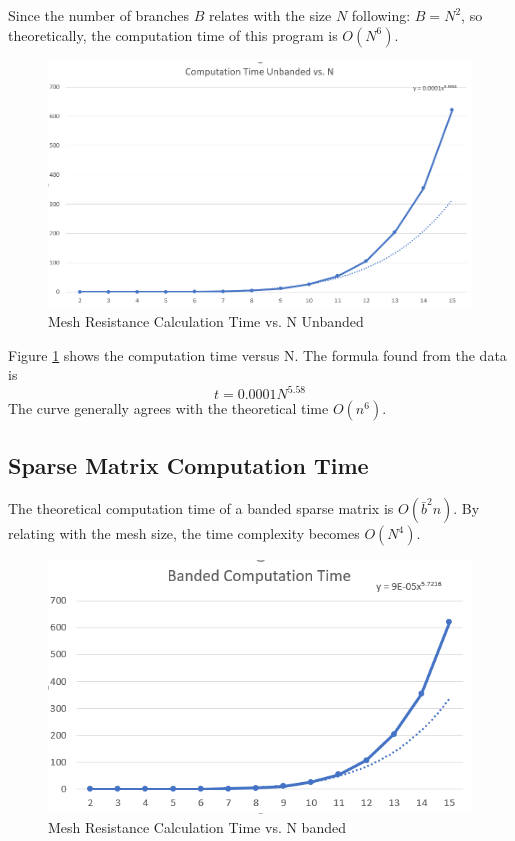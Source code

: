 \documentclass[a4paper,titlepage]{article}
\begin{document}
			Since the number of branches $B$ relates with the size $N$ following: $B = N^2$, so theoretically, the computation time of this program is $O(N^6)$. 			
			\begin{figure}[!h]
				\centering
				\includegraphics[width=\linewidth]{comp_time_unbanded}
				\caption{Mesh Resistance Calculation Time vs. N Unbanded}
				\label{comp_unbanded}
			\end{figure}
		
			Figure \ref{comp_unbanded} shows the computation time versus N. The formula found from the data is 
			$$
				t = 0.0001N^{5.58}
			$$
			The curve generally agrees with the theoretical time $O(n^6)$.
			
		\subsection{Sparse Matrix Computation Time}
			The theoretical computation time of a banded sparse matrix is $O(\bar{b}^2n)$. By relating with the mesh size, the time complexity becomes $O(N^4)$.
			\begin{figure}[!h]
				\centering
				\includegraphics[width=\linewidth]{banded_time}
				\caption{Mesh Resistance Calculation Time vs. N banded}
				\label{comp_banded}
			\end{figure}
		
\end{document}

